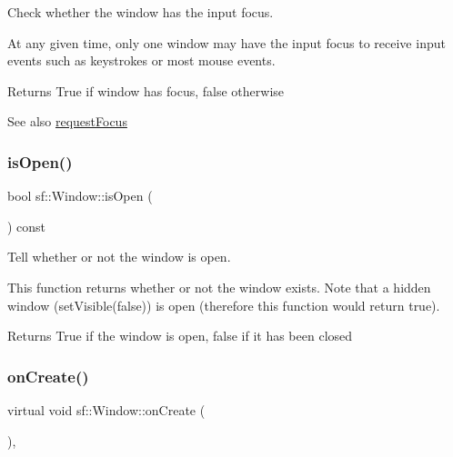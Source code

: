 Check whether the window has the input focus. 

At any given time, only one window may have the input focus to receive input events such as keystrokes or most mouse events.

\begin{DoxyReturn}{Returns}
True if window has focus, false otherwise 
\end{DoxyReturn}
\begin{DoxySeeAlso}{See also}
\hyperlink{classsf_1_1_window_a58cf7fa1775e8e7542032e3ecfa83b49}{request\+Focus} 
\end{DoxySeeAlso}
\mbox{\label{classsf_1_1_window_ae873503db7d48157bb9cbf6129562bce}} 
\subsubsection{\texorpdfstring{is\+Open()}{isOpen()}}
{\footnotesize\ttfamily bool sf\+::\+Window\+::is\+Open (\begin{DoxyParamCaption}{ }\end{DoxyParamCaption}) const}



Tell whether or not the window is open. 

This function returns whether or not the window exists. Note that a hidden window (set\+Visible(false)) is open (therefore this function would return true).

\begin{DoxyReturn}{Returns}
True if the window is open, false if it has been closed 
\end{DoxyReturn}
\mbox{\label{classsf_1_1_window_a106633b9be49b27f83d4712689b493eb}} 
\subsubsection{\texorpdfstring{on\+Create()}{onCreate()}}
{\footnotesize\ttfamily virtual void sf\+::\+Window\+::on\+Create (\begin{DoxyParamCaption}{ }\end{DoxyParamCaption})\hspace{0.3cm}{\ttfamily [protected]}, {\ttfamily [virtual]}}



